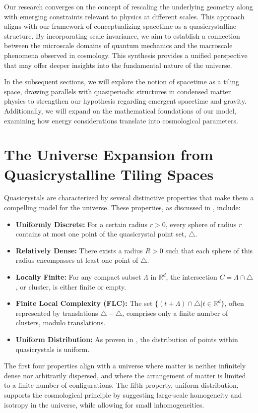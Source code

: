 \documentclass[sn-mathphys-num]{sn-jnl}%
\begin{document}
Our research converges on the concept of rescaling the underlying geometry along with emerging constraints relevant to physics at different scales. This approach aligns with our framework of conceptualizing spacetime as a quasicrystalline structure. By incorporating scale invariance, we aim to establish a connection between the microscale domains of quantum mechanics and the macroscale phenomena observed in cosmology. This synthesis provides a unified perspective that may offer deeper insights into the fundamental nature of the universe.

In the subsequent sections, we will explore the notion of spacetime as a tiling space, drawing parallels with quasiperiodic structures in condensed matter physics to strengthen our hypothesis regarding emergent spacetime and gravity. Additionally, we will expand on the mathematical foundations of our model, examining how energy considerations translate into cosmological parameters.

\section{The Universe Expansion from Quasicrystalline Tiling Spaces}
\label{sec:freedmaneqqc}
Quasicrystals are characterized by several distinctive properties that make them a compelling model for the universe. These properties, as discussed in \cite{BaakeGrimm}, include: 

\begin{itemize}
    \item \textbf{Uniformly Discrete:} For a certain radius \( r > 0 \), every sphere of radius \( r \) contains at most one point of the quasicrystal point set, \( \triangle \).
    \item \textbf{Relatively Dense:} There exists a radius \( R > 0 \) such that each sphere of this radius encompasses at least one point of \( \triangle \).
    \item \textbf{Locally Finite:} For any compact subset \( \varLambda \) in \( \mathbb{R}^{d} \), the intersection \( C = \varLambda \cap \triangle \), or cluster, is either finite or empty.
    \item \textbf{Finite Local Complexity (FLC):} The set \( \{ (t + \varLambda) \cap \triangle | t \in \mathbb{R}^{d} \} \), often represented by translations \( \triangle - \triangle \), comprises only a finite number of clusters, modulo translations.
    \item \textbf{Uniform Distribution:} As proven in \cite{BaakeGrimm}, the distribution of points within quasicrystals is uniform.
\end{itemize}
The first four properties align with a universe where matter is neither infinitely dense nor arbitrarily dispersed, and where the arrangement of matter is limited to a finite number of configurations. The fifth property, uniform distribution, supports the cosmological principle by suggesting large-scale homogeneity and isotropy in the universe, while allowing for small inhomogeneities.
\end{document}
